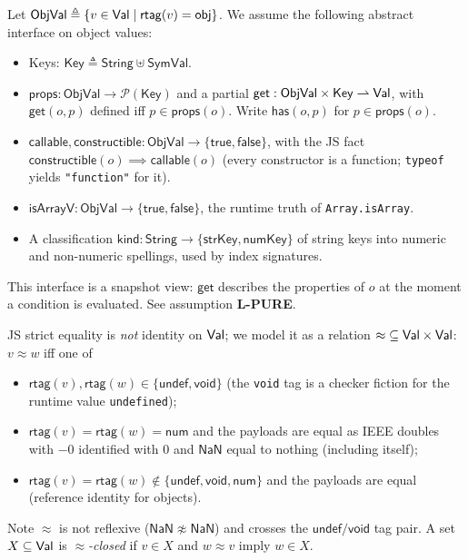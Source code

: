\documentclass[11pt]{article}
\newcommand{\ObjVal}{\mathsf{ObjVal}}
\newcommand{\String}{\mathsf{String}}
\newcommand{\SymVal}{\mathsf{SymVal}}
\newcommand{\rtag}{\mathsf{rtag}}
\begin{document}
\begin{definition}
\label{def:object-interface}
Let $\ObjVal \triangleq \{v \in \Val \mid \rtag(v) = \mathsf{obj}\}$.
We assume the following abstract interface on object values:
\begin{itemize}
\item Keys: $\mathsf{Key} \triangleq \String \uplus \SymVal$.
\item $\mathsf{props} : \ObjVal \to \mathcal{P}(\mathsf{Key})$ and a partial
  $\mathsf{get} : \ObjVal \times \mathsf{Key} \rightharpoonup \Val$, with
  $\mathsf{get}(o,p)$ defined iff $p \in \mathsf{props}(o)$. Write
  $\mathsf{has}(o,p)$ for $p \in \mathsf{props}(o)$.
\item $\mathsf{callable}, \mathsf{constructible} : \ObjVal \to
  \{\mathsf{true},\mathsf{false}\}$, with the JS fact
  $\mathsf{constructible}(o) \implies \mathsf{callable}(o)$ (every
  constructor is a function; \texttt{typeof} yields \texttt{"function"} for
  it).
\item $\mathsf{isArrayV} : \ObjVal \to \{\mathsf{true},\mathsf{false}\}$, the
  runtime truth of \texttt{Array.isArray}.
\item A classification $\mathsf{kind} : \String \to
  \{\mathsf{strKey}, \mathsf{numKey}\}$ of string keys into numeric and
  non-numeric spellings, used by index signatures.
\end{itemize}
This interface is a snapshot view: $\mathsf{get}$ describes the properties of
$o$ at the moment a condition is evaluated. See assumption \textbf{L-PURE}.
\end{definition}

\begin{definition}
\label{def:seq}
JS strict equality is \emph{not} identity on $\mathsf{Val}$; we model it as a
relation ${\approx} \subseteq \mathsf{Val} \times \mathsf{Val}$:
$v \approx w$ iff one of
\begin{itemize}
\item $\rtag(v), \rtag(w) \in \{\mathsf{undef}, \mathsf{void}\}$ (the
  \texttt{void} tag is a checker fiction for the runtime value
  \texttt{undefined});
\item $\rtag(v) = \rtag(w) = \mathsf{num}$ and the payloads are equal as
  IEEE doubles with $-0$ identified with $0$ and $\mathsf{NaN}$ equal to
  nothing (including itself);
\item $\rtag(v) = \rtag(w) \notin \{\mathsf{undef},\mathsf{void},
  \mathsf{num}\}$ and the payloads are equal (reference identity for
  objects).
\end{itemize}
Note $\approx$ is not reflexive ($\mathsf{NaN} \not\approx \mathsf{NaN}$)
and crosses the $\mathsf{undef}/\mathsf{void}$ tag pair. A set
$X \subseteq \mathsf{Val}$ is \emph{$\approx$-closed} if $v \in X$ and $w \approx v$
imply $w \in X$.
\end{definition}
\end{document}
